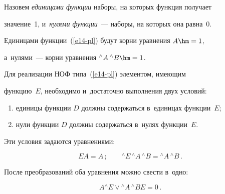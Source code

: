    


   Назовем \textit{единицами функции} наборы, на которых функция получает 


значение~1, и~\textit{нулями функции}~--- наборы, на которых она равна~0.








   


   Единицами функции~(\ref{e14-pl}) будут корни уравнения $A\hm = 1$, 


а~нулями~--- корни уравнения ${^\wedge A}\,{^\wedge B}\hm=1$.





\pagebreak


   


   Для реализации НОФ типа~(\ref{e14-pl}) элементом, имеющим 


функцию~$E$, необходимо и~достаточно выполнения двух условий:


   \begin{enumerate}[(1)]


   \item единицы функции $D$ должны содержаться в~единицах функции~$E$;


   \item нули функции $D$ должны содержаться в~нулях функции~$E$.


   \end{enumerate}


   


   Эти условия задаются уравнениями:


   \begin{equation*}


   E A = A\,;\qquad


   {^\wedge E}\,{^\wedge A}\,{^\wedge B} ={^\wedge A}\,{^\wedge B}\,.


   \end{equation*}


   После преобразований оба уравнения можно свести в~одно:


   \begin{equation}


   A {^\wedge E} \vee  {^\wedge A}\,{^\wedge B} E = 0\,.


   \label{e15-pl}


   \end{equation}


